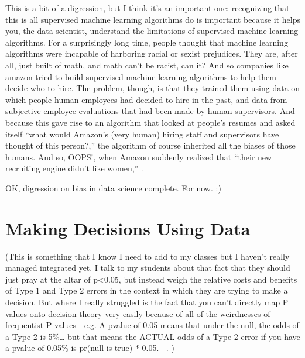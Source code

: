 \documentclass[letterpaper,10pt,english]{jupyterBook}
\begin{document}
\sphinxAtStartPar
This is a bit of a digression, but I think it’s an important one: recognizing that this is all supervised machine learning algorithms do is important because it helps you, the data scientist, understand the limitations of supervised machine learning algorithms. For a surprisingly long time, people thought that machine learning algorithms were incapable of harboring racial or sexist prejudices. They are, after all, just built of math, and math can’t be racist, can it? And so companies like amazon tried to build supervised machine learning algorithms to help them decide who to hire. The problem, though, is that they trained them using data on which people human employees had decided to hire in the past, and data from subjective employee evaluations that had been made by human supervisors. And because this gave rise to an algorithm that looked at people’s resumes and asked itself “what would Amazon’s (very human) hiring staff and supervisors have thought of this person?,” the algorithm of course inherited all the biases of those humans. And so, OOPS!, when Amazon suddenly realized that “their new recruiting engine didn’t like women,” .

\sphinxAtStartPar
OK, digression on bias in data science complete. For now. :)

\sphinxstepscope


\chapter{Making Decisions Using Data}
\label{\detokenize{40_in_practice/20_from_data_to_decisions:making-decisions-using-data}}\label{\detokenize{40_in_practice/20_from_data_to_decisions::doc}}
\sphinxAtStartPar
(This is something that I know I need to add to my classes but I haven’t really managed integrated yet. I talk to my students about that fact that they should just pray at the altar of p<0.05, but instead weigh the relative costs and benefits of Type 1 and Type 2 errors in the context in which they are trying to make a decision. But where I really struggled is the fact that you can’t directly map P values onto decision theory very easily because of all of the weirdnesses of frequentist P values—e.g. A p\sphinxhyphen{}value of 0.05 means that under the null, the odds of a Type 2 is 5\%… but that means the ACTUAL odds of a Type 2 error if you have a p\sphinxhyphen{}value of 0.05\% is pr(null is true) * 0.05. 🤦‍♂️. )
\end{document}
